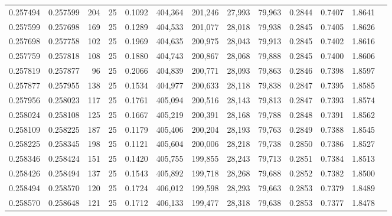 \begin{tabular}{rrrrrrrrrrrrr}
0.257494 & 0.257599 &   204 &  25 &                                     0.1092 & 404,364 & 201,246 &  27,993 &  79,963 & 0.2844 & 0.7407 & 1.8641 \\
0.257599 & 0.257698 &   169 &  25 &                                     0.1289 & 404,533 & 201,077 &  28,018 &  79,938 & 0.2845 & 0.7405 & 1.8626 \\
0.257698 & 0.257758 &   102 &  25 &                                     0.1969 & 404,635 & 200,975 &  28,043 &  79,913 & 0.2845 & 0.7402 & 1.8616 \\
0.257759 & 0.257818 &   108 &  25 &                                     0.1880 & 404,743 & 200,867 &  28,068 &  79,888 & 0.2845 & 0.7400 & 1.8606 \\
0.257819 & 0.257877 &    96 &  25 &                                     0.2066 & 404,839 & 200,771 &  28,093 &  79,863 & 0.2846 & 0.7398 & 1.8597 \\
0.257877 & 0.257955 &   138 &  25 &                                     0.1534 & 404,977 & 200,633 &  28,118 &  79,838 & 0.2847 & 0.7395 & 1.8585 \\
0.257956 & 0.258023 &   117 &  25 &                                     0.1761 & 405,094 & 200,516 &  28,143 &  79,813 & 0.2847 & 0.7393 & 1.8574 \\
0.258024 & 0.258108 &   125 &  25 &                                     0.1667 & 405,219 & 200,391 &  28,168 &  79,788 & 0.2848 & 0.7391 & 1.8562 \\
0.258109 & 0.258225 &   187 &  25 &                                     0.1179 & 405,406 & 200,204 &  28,193 &  79,763 & 0.2849 & 0.7388 & 1.8545 \\
0.258225 & 0.258345 &   198 &  25 &                                     0.1121 & 405,604 & 200,006 &  28,218 &  79,738 & 0.2850 & 0.7386 & 1.8527 \\
0.258346 & 0.258424 &   151 &  25 &                                     0.1420 & 405,755 & 199,855 &  28,243 &  79,713 & 0.2851 & 0.7384 & 1.8513 \\
0.258426 & 0.258494 &   137 &  25 &                                     0.1543 & 405,892 & 199,718 &  28,268 &  79,688 & 0.2852 & 0.7382 & 1.8500 \\
0.258494 & 0.258570 &   120 &  25 &                                     0.1724 & 406,012 & 199,598 &  28,293 &  79,663 & 0.2853 & 0.7379 & 1.8489 \\
0.258570 & 0.258648 &   121 &  25 &                                     0.1712 & 406,133 & 199,477 &  28,318 &  79,638 & 0.2853 & 0.7377 & 1.8478 \\

\end{tabular}

